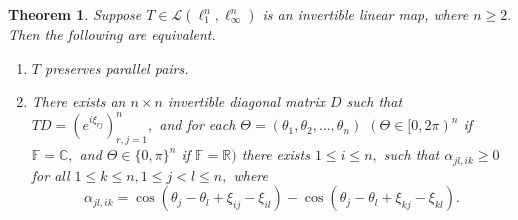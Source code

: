 \documentclass{amsart}
\newtheorem{theorem}{Theorem}[section]
\theoremstyle{definition}
\theoremstyle{remark}
\numberwithin{equation}{section}
\begin{document}
\begin{theorem}\label{th-inv}
	Suppose $T\in \mathcal{L}(\ell_1^n, \ell_\infty^n)$  is an invertible linear map, where $n\geq 2.$ Then the following are equivalent.
	\begin{enumerate}
		\item $T$  preserves parallel pairs.
		\item There exists an $n\times n$ invertible diagonal matrix $D$ such that $TD=(e^{i\xi_{rj}})_{r,j=1}^n,$ and for each $\Theta=(\theta_1,\theta_2,\ldots,\theta_n)$ $(\Theta\in [0,2\pi)^n$ if $\mathbb{F}=\mathbb{C}, $ and $\Theta\in \{0,\pi\}^n$ if $\mathbb{F}=\mathbb{R})$ there exists $1\leq i\leq n,$ such that  $\alpha_{jl,ik}\geq 0$ for all $1\leq k\leq n, 1\leq j<l\leq n,$ where  $$\alpha_{jl,ik}=\cos(\theta_j-\theta_l+\xi_{ij}-\xi_{il})-\cos(\theta_j-\theta_l+\xi_{kj}-\xi_{kl}).$$
	\end{enumerate}
\end{theorem}
\end{document}
